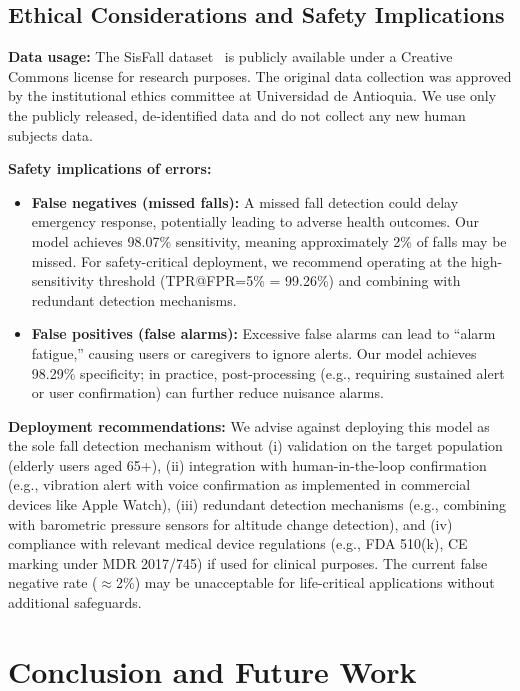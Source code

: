 \documentclass{article}
\begin{document}
\subsection{Ethical Considerations and Safety Implications}

\textbf{Data usage:} The SisFall dataset~\cite{sucerquia2017sisfall} is publicly available under a Creative Commons license for research purposes. The original data collection was approved by the institutional ethics committee at Universidad de Antioquia. We use only the publicly released, de-identified data and do not collect any new human subjects data.

\textbf{Safety implications of errors:}
\begin{itemize}
    \item \textbf{False negatives (missed falls):} A missed fall detection could delay emergency response, potentially leading to adverse health outcomes. Our model achieves 98.07\% sensitivity, meaning approximately 2\% of falls may be missed. For safety-critical deployment, we recommend operating at the high-sensitivity threshold (TPR@FPR=5\% = 99.26\%) and combining with redundant detection mechanisms.
    \item \textbf{False positives (false alarms):} Excessive false alarms can lead to ``alarm fatigue,'' causing users or caregivers to ignore alerts. Our model achieves 98.29\% specificity; in practice, post-processing (e.g., requiring sustained alert or user confirmation) can further reduce nuisance alarms.
\end{itemize}

\textbf{Deployment recommendations:} We advise against deploying this model as the sole fall detection mechanism without (i) validation on the target population (elderly users aged 65+), (ii) integration with human-in-the-loop confirmation (e.g., vibration alert with voice confirmation as implemented in commercial devices like Apple Watch), (iii) redundant detection mechanisms (e.g., combining with barometric pressure sensors for altitude change detection), and (iv) compliance with relevant medical device regulations (e.g., FDA 510(k), CE marking under MDR 2017/745) if used for clinical purposes. The current false negative rate ($\approx$2\%) may be unacceptable for life-critical applications without additional safeguards.

\section{Conclusion and Future Work}
\end{document}
